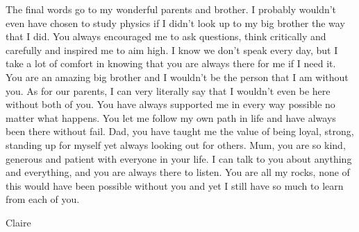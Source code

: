 The final words go to my wonderful parents and brother. I probably wouldn’t even have chosen to study physics if I didn’t look up to my big brother the way that I did. You always encouraged me to ask questions, think critically and carefully and inspired me to aim high. I know we don’t speak every day, but I take a lot of comfort in knowing that you are always there for me if I need it. You are an amazing big brother and I wouldn’t be the person that I am without you. As for our parents, I can very literally say that I wouldn’t even be here without both of you. You have always supported me in every way possible no matter what happens. You let me follow my own path in life and have always been there without fail. Dad, you have taught me the value of being loyal, strong, standing up for myself yet always looking out for others. Mum, you are so kind, generous and patient with everyone in your life. I can talk to you about anything and everything, and you are always there to listen. You are all my rocks, none of this would have been possible without you and yet I still have so much to learn from each of you.



\raggedleft
Claire




